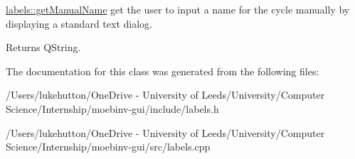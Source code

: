 \mbox{\hyperlink{classlabels_a629e15f96a5f73b4bfdb9b18b9b98092}{labels\+::get\+Manual\+Name}} get the user to input a name for the cycle manually by displaying a standard text dialog. 

\begin{DoxyReturn}{Returns}
Q\+String. 
\end{DoxyReturn}


The documentation for this class was generated from the following files\+:\begin{DoxyCompactItemize}
\item 
/\+Users/lukehutton/\+One\+Drive -\/ University of Leeds/\+University/\+Computer Science/\+Internship/moebinv-\/gui/include/labels.\+h\item 
/\+Users/lukehutton/\+One\+Drive -\/ University of Leeds/\+University/\+Computer Science/\+Internship/moebinv-\/gui/src/labels.\+cpp\end{DoxyCompactItemize}
